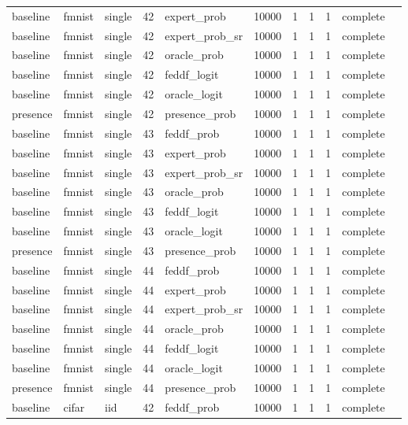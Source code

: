 \begin{tabular}{lllrlrrrrll}
baseline & fmnist & single & 42 & expert\_prob & 10000 & 1 & 1 & 1 & complete &  \\
baseline & fmnist & single & 42 & expert\_prob\_sr & 10000 & 1 & 1 & 1 & complete &  \\
baseline & fmnist & single & 42 & oracle\_prob & 10000 & 1 & 1 & 1 & complete &  \\
baseline & fmnist & single & 42 & feddf\_logit & 10000 & 1 & 1 & 1 & complete &  \\
baseline & fmnist & single & 42 & oracle\_logit & 10000 & 1 & 1 & 1 & complete &  \\
presence & fmnist & single & 42 & presence\_prob & 10000 & 1 & 1 & 1 & complete &  \\
baseline & fmnist & single & 43 & feddf\_prob & 10000 & 1 & 1 & 1 & complete &  \\
baseline & fmnist & single & 43 & expert\_prob & 10000 & 1 & 1 & 1 & complete &  \\
baseline & fmnist & single & 43 & expert\_prob\_sr & 10000 & 1 & 1 & 1 & complete &  \\
baseline & fmnist & single & 43 & oracle\_prob & 10000 & 1 & 1 & 1 & complete &  \\
baseline & fmnist & single & 43 & feddf\_logit & 10000 & 1 & 1 & 1 & complete &  \\
baseline & fmnist & single & 43 & oracle\_logit & 10000 & 1 & 1 & 1 & complete &  \\
presence & fmnist & single & 43 & presence\_prob & 10000 & 1 & 1 & 1 & complete &  \\
baseline & fmnist & single & 44 & feddf\_prob & 10000 & 1 & 1 & 1 & complete &  \\
baseline & fmnist & single & 44 & expert\_prob & 10000 & 1 & 1 & 1 & complete &  \\
baseline & fmnist & single & 44 & expert\_prob\_sr & 10000 & 1 & 1 & 1 & complete &  \\
baseline & fmnist & single & 44 & oracle\_prob & 10000 & 1 & 1 & 1 & complete &  \\
baseline & fmnist & single & 44 & feddf\_logit & 10000 & 1 & 1 & 1 & complete &  \\
baseline & fmnist & single & 44 & oracle\_logit & 10000 & 1 & 1 & 1 & complete &  \\
presence & fmnist & single & 44 & presence\_prob & 10000 & 1 & 1 & 1 & complete &  \\
baseline & cifar & iid & 42 & feddf\_prob & 10000 & 1 & 1 & 1 & complete &  \\

\end{tabular}
